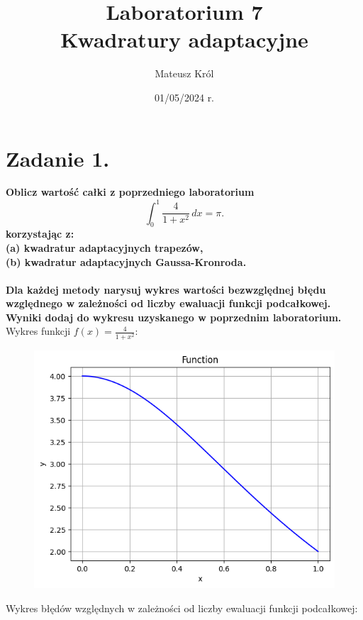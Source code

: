 \documentclass{article}
\title{%
Laboratorium 7\\
  \huge Kwadratury adaptacyjne}
\author{Mateusz Król}
\date{01/05/2024 r.}
\begin{document}
\maketitle

 
\section*{Zadanie 1.}
\textbf{Oblicz wartość całki z poprzedniego laboratorium
$$ \int_{0}^{1} \frac{4}{1+x^2} \,dx = \pi.$$
korzystając z:\\
(a) kwadratur adaptacyjnych trapezów,\\
(b) kwadratur adaptacyjnych Gaussa-Kronroda.\\\\
Dla każdej metody narysuj wykres wartości bezwzględnej błędu względnego w
zależności od liczby ewaluacji funkcji podcałkowej. Wyniki dodaj do wykresu
uzyskanego w poprzednim laboratorium.}
\newpage
Wykres funkcji $f(x) = \frac{4}{1+x^2}$:
\begin{figure}[H]
  \includegraphics[width=\linewidth]{figures/f.png}
\end{figure}
Wykres błędów względnych w zależności od liczby ewaluacji
funkcji podcałkowej:
\end{document}
